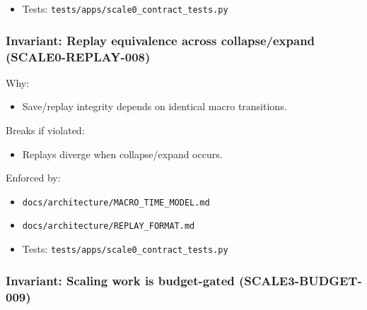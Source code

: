\documentclass[9pt,a4paper,openany]{book}
\begin{document}
\begin{itemize}
\item Tests: \texttt{tests/\allowbreak{}apps/\allowbreak{}scale0\_\allowbreak{}contract\_\allowbreak{}tests.\allowbreak{}py}
\end{itemize}





\subsubsection{Invariant: Replay equivalence across collapse/expand (SCALE0-REPLAY-008)}


Why:



\begin{itemize}
\item Save/\allowbreak{}replay integrity depends on identical macro transitions.\allowbreak{}
\end{itemize}


Breaks if violated:



\begin{itemize}
\item Replays diverge when collapse/\allowbreak{}expand occurs.\allowbreak{}
\end{itemize}


Enforced by:



\begin{itemize}
\item \texttt{docs/\allowbreak{}architecture/\allowbreak{}MACRO\_\allowbreak{}TIME\_\allowbreak{}MODEL.\allowbreak{}md}
\end{itemize}


\begin{itemize}
\item \texttt{docs/\allowbreak{}architecture/\allowbreak{}REPLAY\_\allowbreak{}FORMAT.\allowbreak{}md}
\end{itemize}


\begin{itemize}
\item Tests: \texttt{tests/\allowbreak{}apps/\allowbreak{}scale0\_\allowbreak{}contract\_\allowbreak{}tests.\allowbreak{}py}
\end{itemize}





\subsubsection{Invariant: Scaling work is budget-gated (SCALE3-BUDGET-009)}
\end{document}
